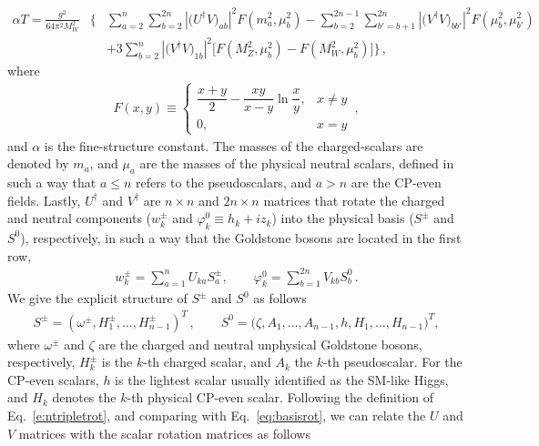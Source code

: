 \documentclass[11pt]{article}
\begin{document}
%
\begin{eqnarray}
\label{e:grimus_v2}
\alpha T = \frac{g^2}{64\pi^2M_W^2} &\Bigg\{& \sum_{a=2}^{n} \sum_{b=2}^{2n} \left\lvert \big( U^\dagger V \big)_{ab} \right\rvert^2F\left(m_a^2,\mu_b^2\right) - \sum_{b=2}^{2n-1}\sum_{b'=b+1}^{2n}\left\lvert\big(V^\dagger V\big)_{bb'}\right\rvert^2 F\left(\mu_b^2,\mu_{b'}^2\right) \nonumber \\&&  +3\sum_{b=2}^{n}\left\lvert\big(V^\dagger V\big)_{1b}\right\rvert^2\bigg[F\left(M_Z^2,\mu_b^2\right)-F\left(M_W^2,\mu_b^2\right)\bigg]\Bigg\}\,,
\end{eqnarray}
%
where 
%
\begin{eqnarray}
\label{e:tparam_Fxy_v2}
F(x,y) \equiv \left\{ \begin{matrix} \dfrac{x+y}{2}-\dfrac{xy}{x-y}\ln\dfrac{x}{y}, & x\neq y \\ 0, &  x=y \end{matrix} \right. \, ,
\end{eqnarray}
%
and $\alpha$ is the fine-structure constant.  
The masses of the charged-scalars are denoted by $m_a$, and $\mu_a$ are the masses of the physical neutral scalars, defined in such a way that $a \leq n$ refers to the pseudoscalars, and $a >  n$ are the CP-even fields.  
Lastly, $U^\dagger$ and $V^\dagger$ are $n\times n$ and $2 n \times n$ matrices that rotate the charged and neutral components ($w_k^\pm$ and $\varphi_k^0 \equiv h_k + i z_k$) into the physical basis ($S^\pm$ and $S^0$), respectively, in such a way that the Goldstone bosons are located in the first row, 
%
\begin{eqnarray}
\label{eq:basisrot}
w_k^\pm = \sum_{a=1}^{n} U_{ka} S_a^\pm, \qquad \varphi_k^0 = \sum_{b=1}^{2n} V_{kb} S_b^0\, .
\end{eqnarray}
%
We give the explicit structure of $S^\pm$ and $S^0$ as follows
%
\begin{eqnarray}
S^\pm = \left( \omega^\pm ,  H_1^\pm  ,  \dots  ,  H_{n-1}^\pm \right)^T \, , \qquad S^0 = \big( \zeta ,  A_1  ,  \dots  ,  A_{n-1},  h,  H_1, \dots ,  H_{n-1} \big)^T , 
\end{eqnarray}
%
where $\omega^\pm$ and $\zeta$ are the charged and neutral unphysical Goldstone bosons, respectively,  
$H_k^\pm$ is the $k$-th charged scalar, and $A_k$ the $k$-th pseudoscalar.  
For the CP-even scalars, $h$ is the lightest scalar usually identified as the SM-like Higgs, and $H_k$ denotes the $k$-th physical CP-even scalar.  
Following the definition of Eq.~\eqref{e:ntripletrot}, and comparing with Eq.~\eqref{eq:basisrot}, we can relate the $U$ and $V$ matrices with the scalar rotation matrices as follows
\end{document}
